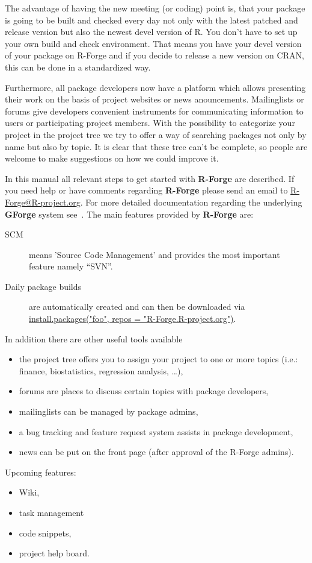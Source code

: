 \documentclass[a4paper]{article}
\begin{document}
The advantage of having the new meeting (or coding) 
point is, that your package is going to be built and checked every day
not only with the latest patched and release version but also the
newest devel version of R. You don't have to set up your own
build and check environment. That means you have your devel version of
your package on R-Forge and if you decide to release a new
version on CRAN, this can be done in a standardized way.

Furthermore, all package developers now have a
platform which allows presenting their work on the basis of project
websites or
news anouncements. Mailinglists or forums give developers convenient
instruments for communicating information to users or participating
project members.
With the possibility to categorize your project in the project tree we
try to offer a way of searching packages not only by name but also by
topic. It is clear that these tree can't be complete, so people are
welcome to make suggestions on how we could improve it.
 
In this manual all relevant steps to get
started with \textbf{R-Forge} are described. If you need help or have
comments regarding \textbf{R-Forge} please send an email to
\url{R-Forge@R-project.org}. For more detailed
documentation regarding the underlying \textbf{GForge} system
see~\cite{manual:gforge}.\newline 
\newline
The main features provided by \textbf{R-Forge} are:
\begin{description}
\item[SCM] means 'Source Code Management' and provides the most
  important feature namely ``SVN''.
\item[Daily package builds] are automatically created and can then be
  downloaded via\newline 
  \url{install.packages("foo", repos = "R-Forge.R-project.org")}.
\end{description}
In addition there are other useful tools available
\begin{itemize}
\item the project tree offers you to assign your project to one or more
  topics (i.e.: finance, biostatistics, regression analysis, \ldots),
\item forums are places to discuss certain topics with package
  developers,
\item mailinglists can be managed by package admins,
\item a bug tracking and feature request system assists in package
  development,
\item news can be put on the front page (after approval of the R-Forge
  admins).
\end{itemize}
Upcoming features:
\begin{itemize}
\item Wiki,
\item task management
\item code snippets,
\item project help board.
\end{itemize}
\end{document}
